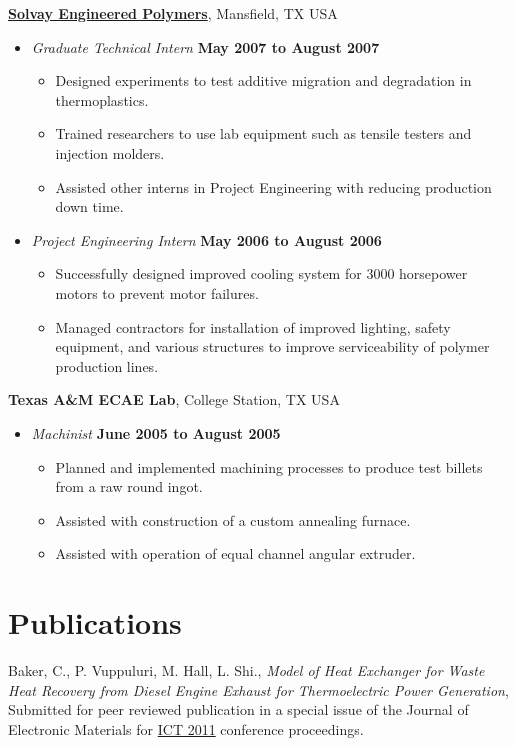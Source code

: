 \documentclass[line,margin]{res}
\begin{document}
\begin{resume}
\href{http://www.lyondellbasell.com/LandingPages/SolvayEngineeredPolymers}{\textbf{Solvay
    Engineered Polymers}}, Mansfield, TX USA 
\begin{itemize}
\item \textit{Graduate Technical Intern}%
  \hfill \textbf{May 2007 to August 2007}
  \begin{itemize}
  \item Designed experiments to test additive migration
    and degradation in thermoplastics.
  \item Trained researchers to use lab equipment such as tensile
    testers and injection molders.
  \item Assisted other interns in Project Engineering with
    reducing production down time.
  \end{itemize}
\item \textit{Project Engineering Intern}%
  \hfill \textbf{May 2006 to August 2006}
  \begin{itemize}
  \item Successfully designed improved cooling system for 3000
    horsepower motors to prevent motor failures.
  \item Managed contractors for installation of improved lighting,
    safety equipment, and various structures to improve serviceability
    of polymer production lines.
  \end{itemize}
\end{itemize}

\newpage{}

\textbf{Texas A\&M ECAE Lab}, College Station, TX USA
\begin{itemize}
\item \textit{Machinist}%
  \hfill \textbf{June 2005 to August 2005}
  \begin{itemize}
  \item Planned and implemented machining processes to produce test
    billets from a raw round ingot.
  \item Assisted with construction of a custom annealing furnace.
  \item Assisted with operation of equal channel angular extruder.
  \end{itemize}
\end{itemize}

\section{Publications}

Baker, C., P. Vuppuluri, M. Hall, L. Shi., \textit{Model of Heat
  Exchanger for Waste Heat Recovery from Diesel Engine Exhaust for
  Thermoelectric Power Generation}, Submitted for peer reviewed
publication in a special issue of the Journal of Electronic Materials
for \href{http://ict2011.its.org/}{ICT 2011} conference proceedings.


\end{resume}
\end{document}
